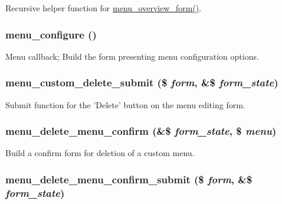 Recursive helper function for \hyperlink{menu_8admin_8inc_cddf1ae47e6d4796c437447fd1a1a88e}{menu\_\-overview\_\-form()}. \hypertarget{menu_8admin_8inc_06edf99d84102336d33cb6fd3201d1ca}{
\subsubsection[{menu\_\-configure}]{\setlength{\rightskip}{0pt plus 5cm}menu\_\-configure ()}}
\label{menu_8admin_8inc_06edf99d84102336d33cb6fd3201d1ca}


Menu callback; Build the form presenting menu configuration options. \hypertarget{menu_8admin_8inc_be39d1c961ad32624a0c927ecb9ca611}{
\subsubsection[{menu\_\-custom\_\-delete\_\-submit}]{\setlength{\rightskip}{0pt plus 5cm}menu\_\-custom\_\-delete\_\-submit (\$ {\em form}, \/  \&\$ {\em form\_\-state})}}
\label{menu_8admin_8inc_be39d1c961ad32624a0c927ecb9ca611}


Submit function for the 'Delete' button on the menu editing form. \hypertarget{menu_8admin_8inc_ba71f7fe1edefa473c9ffa0130238f19}{
\subsubsection[{menu\_\-delete\_\-menu\_\-confirm}]{\setlength{\rightskip}{0pt plus 5cm}menu\_\-delete\_\-menu\_\-confirm (\&\$ {\em form\_\-state}, \/  \$ {\em menu})}}
\label{menu_8admin_8inc_ba71f7fe1edefa473c9ffa0130238f19}


Build a confirm form for deletion of a custom menu. \hypertarget{menu_8admin_8inc_072747a64b798d6967fbf81e046a5475}{
\subsubsection[{menu\_\-delete\_\-menu\_\-confirm\_\-submit}]{\setlength{\rightskip}{0pt plus 5cm}menu\_\-delete\_\-menu\_\-confirm\_\-submit (\$ {\em form}, \/  \&\$ {\em form\_\-state})}}
\label{menu_8admin_8inc_072747a64b798d6967fbf81e046a5475}


